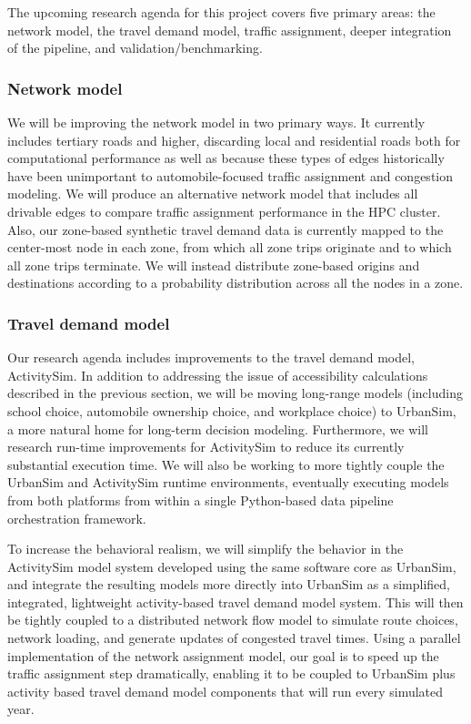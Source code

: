 The upcoming research agenda for this project covers five primary areas: the network model, the travel demand model, traffic assignment, deeper integration of the pipeline, and validation/benchmarking.

\subsubsection{Network model}

We will be improving the network model in two primary ways. It currently includes tertiary roads and higher, discarding local and residential roads both for computational performance as well as because these types of edges historically have been unimportant to automobile-focused traffic assignment and congestion modeling. We will produce an alternative network model that includes all drivable edges to compare traffic assignment performance in the HPC cluster. Also, our zone-based synthetic travel demand data is currently mapped to the center-most node in each zone, from which all zone trips originate and to which all zone trips terminate. We will instead distribute zone-based origins and destinations according to a probability distribution across all the nodes in a zone.

\subsubsection{Travel demand model}

Our research agenda includes improvements to the travel demand model, ActivitySim. In addition to addressing the issue of accessibility calculations described in the previous section, we will be moving long-range models (including school choice, automobile ownership choice, and workplace choice) to UrbanSim, a more natural home for long-term decision modeling. Furthermore, we will research run-time improvements for ActivitySim to reduce its currently substantial execution time. We will also be working to more tightly couple the UrbanSim and ActivitySim runtime environments, eventually executing models from both platforms from within a single Python-based data pipeline orchestration framework. 

To increase the behavioral realism, we will simplify the behavior in the ActivitySim model system developed using the same software core as UrbanSim, and integrate the resulting models more directly into UrbanSim as a simplified, integrated, lightweight activity-based travel demand model system. This will then be tightly coupled to a distributed network flow model to simulate route choices, network loading, and generate updates of congested travel times. Using a parallel implementation of the network assignment model, our goal is to speed up the traffic assignment step dramatically, enabling it to be coupled to UrbanSim plus activity based travel demand model components that will run every simulated year.

